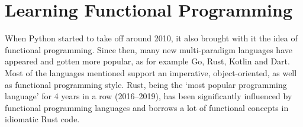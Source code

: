 





\section{Learning Functional Programming}
When Python started to take off around 2010\cite{python-popularity},
it also brought with it the idea of functional programming. Since then, many new multi-paradigm
languages have appeared and gotten more popular, as for example Go, Rust,
Kotlin and Dart.
Most of the languages mentioned support an imperative, object-oriented, as well as functional programming style.
Rust, being the `most popular programming language'\cite{rust-loved} for 4 years in a row (2016--2019), has been
significantly influenced by functional programming languages\cite{rust-functional} and borrows a lot of functional
concepts in idiomatic Rust code.

